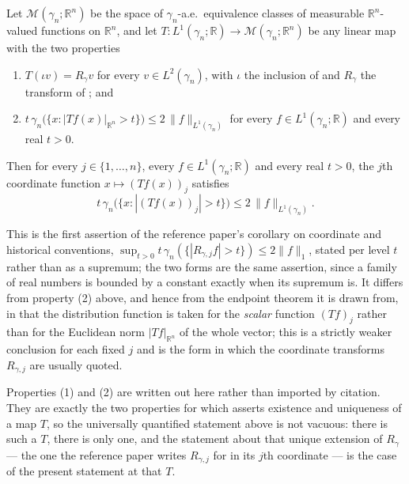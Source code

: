 \begin{corollary}
Let $\mathcal{M}(\gamma_n;\mathbb{R}^n)$ be the space of $\gamma_n$-a.e.\
equivalence classes of measurable $\mathbb{R}^n$-valued functions on
$\mathbb{R}^n$, and let
$T : L^1(\gamma_n;\mathbb{R}) \to \mathcal{M}(\gamma_n;\mathbb{R}^n)$ be any
linear map with the two properties
\begin{enumerate}
\item $T(\iota v) = R_\gamma v$ for every $v \in L^2(\gamma_n)$, with $\iota$ the
inclusion of \noderef{ToL1} and $R_\gamma$ the transform of
; and
\item $t\,\gamma_n\bigl(\{x : |Tf(x)|_{\mathbb{R}^n} > t\}\bigr)
       \leq 2\,\|f\|_{L^1(\gamma_n)}$
for every $f \in L^1(\gamma_n;\mathbb{R})$ and every real $t > 0$.
\end{enumerate}
Then for every $j \in \{1,\ldots,n\}$, every $f \in L^1(\gamma_n;\mathbb{R})$ and
every real $t > 0$, the $j$th coordinate function $x \mapsto (Tf(x))_j$ satisfies
\[
  t\,\gamma_n\bigl(\{x : |(Tf(x))_j| > t\}\bigr) \leq 2\,\|f\|_{L^1(\gamma_n)} .
\]

This is the first assertion of the reference paper's corollary on coordinate and
historical conventions,
$\sup_{t>0} t\,\gamma_n(\{|R_{\gamma,j}f|>t\}) \leq 2\|f\|_1$, stated per level
$t$ rather than as a supremum; the two forms are the same assertion, since a
family of real numbers is bounded by a constant exactly when its supremum is.
It differs from property (2) above, and hence from the endpoint theorem it is
drawn from, in that the distribution function is taken for the \emph{scalar}
function $(Tf)_j$ rather than for the Euclidean norm $|Tf|_{\mathbb{R}^n}$ of the
whole vector; this is a strictly weaker conclusion for each fixed $j$ and is the
form in which the coordinate transforms $R_{\gamma,j}$ are usually quoted.

Properties (1) and (2) are written out here rather than imported by citation.
They are exactly the two properties for which \noderef{EndpointTheorem} asserts
existence and uniqueness of a map $T$, so the universally quantified statement
above is not vacuous: there is such a $T$, there is only one, and the statement
about that unique extension of $R_\gamma$ --- the one the reference paper writes
$R_{\gamma,j}$ for in its $j$th coordinate --- is the case of the present
statement at that $T$.
\end{corollary}
